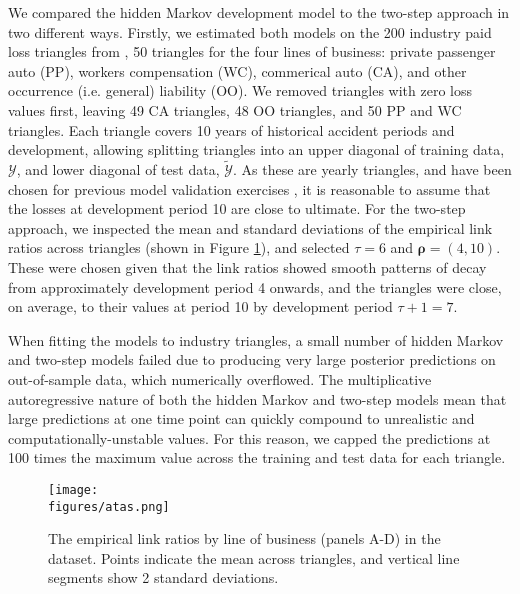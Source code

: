 We compared the hidden Markov development model to
the two-step approach in two different ways.
Firstly, we estimated both models on the 200 industry
paid loss triangles from \cite{meyers2015}, 50 triangles
for the four lines of business: private passenger auto (PP),
workers compensation (WC), commerical auto (CA), and
other occurrence (i.e. general) liability (OO).
We removed triangles with zero loss values first,
leaving 49 CA triangles, 48 OO triangles, and
50 PP and WC triangles.
Each triangle covers 10 years of historical
accident periods and development, allowing splitting
triangles into an upper diagonal of training data,
$\mathcal{Y}$, and lower diagonal of test data,
$\tilde{\mathcal{Y}}$.
As these are yearly triangles, and have been
chosen for previous model validation exercises \citep{meyers2015},
it is reasonable to assume that the losses at development
period 10 are close to ultimate.
For the two-step approach, we inspected the
mean and standard deviations of the empirical
link ratios across triangles (shown in Figure
\ref{fig:industry-atas}), and selected
$\tau = 6$ and $\bm{\rho} = (4, 10)$. These
were chosen given
that the link ratios showed smooth patterns
of decay from approximately development period
4 onwards, and the
triangles were close, on average, to their values
at period 10 by development period $\tau + 1 = 7$.

When fitting the models to industry triangles,
a small number of hidden Markov and two-step
models failed due to producing
very large posterior predictions on out-of-sample
data, which numerically overflowed. The multiplicative
autoregressive nature of both the hidden Markov and
two-step models mean that large predictions at one
time point can quickly compound to unrealistic and
computationally-unstable values. For this reason,
we capped the predictions at 100 times the
maximum value across the training and test data
for each triangle.

\begin{figure}
    \centering
    \texttt{[image: \\figures/atas.png]}
    \caption{
        The empirical link ratios by line of business 
		(panels A-D) in
        the \cite{meyers2015} dataset.
        Points indicate the mean across triangles,
        and vertical line segments show 2 standard
        deviations.
    }
	\label{fig:industry-atas}
\end{figure}

